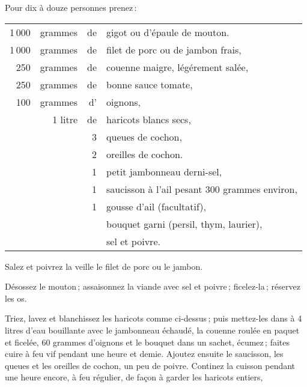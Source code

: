 \medskip

Pour dix à douze personnes prenez :

\footnotesize
\begin{longtable}{rrrp{18em}}
  1 000 & grammes & de & gigot ou d'épaule de mouton.                                                     \\
  1 000 & grammes & de & filet de porc ou de jambon frais,                                                \\
    250 & grammes & de & couenne maigre, légérement salée,                                                \\
    250 & grammes & de & bonne sauce tomate,                                                              \\
    100 & grammes & d' & oignons,                                                                         \\
        & 1 litre & de & haricots blancs secs,                                                            \\
        &         &  3 & queues de cochon,                                                                \\
        &         &  2 & oreilles de cochon.                                                              \\
        &         &  1 & petit jambonneau derni-sel,                                                      \\
        &         &  1 & saucisson à l'ail pesant 300 grammes environ,                                    \\
        &         &  1 & gousse d'ail (facultatif),                                                       \\
        &         &    & bouquet garni (persil, thym, laurier),                                           \\
        &         &    & sel et poivre.                                                                   \\
\end{longtable}
\normalsize

Salez et poivrez la veille le filet de porc ou le jambon.

Désossez le mouton ; assaisonnez la viande avec sel et poivre ; ficelez-la ;
réservez les os.

Triez, lavez et blanchissez les haricots comme ci-dessus ; puis mettez-les dans
{\mmm} à 4 litres d'eau bouillante avec le jambonneau échaudé, la couenne
roulée en paquet et ficelée, 60 grammes d'oignons et le bouquet dans un sachet,
écumez ; faites cuire à feu vif pendant une heure et demie. Ajoutez ensuite le
saucisson, les queues et les oreilles de cochon, un peu de poivre. Continez la
cuisson pendant une heure encore, à feu régulier, de façon à garder les
haricots entiers,


